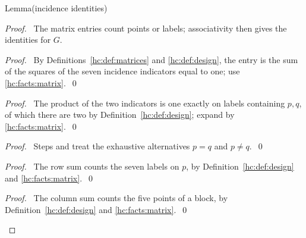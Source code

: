 \begin{mergedproofsection}
\begin{namedresult}{Lemma}{(incidence identities)}\label{hc:lem:incidence}
 \leavevmode\par
\end{namedresult}
\begin{proof}
 \pfsketch\ The matrix entries count points or labels; associativity
 then gives the identities for $G$.
 \begin{proof}\pf\ By Definitions~\ref{hc:def:matrices} and
  \ref{hc:def:design}, the entry is the sum of the squares of the
  seven incidence indicators equal to one; use \ref{hc:facts:matrix}.~\qed\end{proof}
 \begin{proof}\pf\ The product of the two indicators is one exactly
  on labels containing $p,q$, of which there are two by
  Definition~\ref{hc:def:design}; expand by \ref{hc:facts:matrix}.~\qed\end{proof}
 \begin{proof}\pf\ Steps  and 
  treat the exhaustive alternatives $p=q$ and $p\ne q$.~\qed\end{proof}
 \begin{proof}\pf\ The row sum counts the seven labels on $p$,
  by Definition~\ref{hc:def:design} and \ref{hc:facts:matrix}.~\qed\end{proof}
 \begin{proof}\pf\ The column sum counts the five points of a block,
  by Definition~\ref{hc:def:design} and \ref{hc:facts:matrix}.~\qed\end{proof}

\end{proof}
\end{mergedproofsection}
